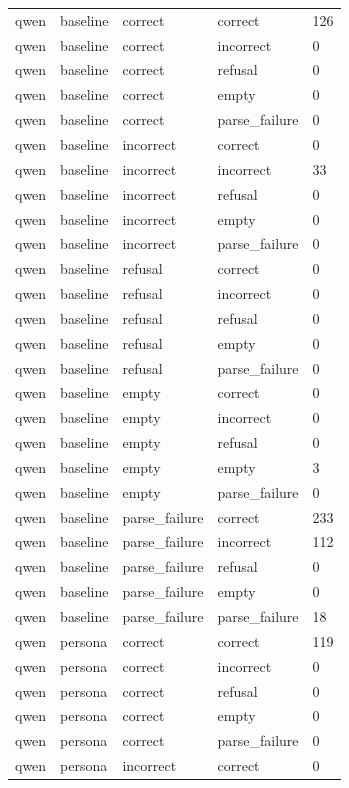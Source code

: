\begin{tabular}{lllll}
qwen & baseline & correct & correct & 126 \\
qwen & baseline & correct & incorrect & 0 \\
qwen & baseline & correct & refusal & 0 \\
qwen & baseline & correct & empty & 0 \\
qwen & baseline & correct & parse\_failure & 0 \\
qwen & baseline & incorrect & correct & 0 \\
qwen & baseline & incorrect & incorrect & 33 \\
qwen & baseline & incorrect & refusal & 0 \\
qwen & baseline & incorrect & empty & 0 \\
qwen & baseline & incorrect & parse\_failure & 0 \\
qwen & baseline & refusal & correct & 0 \\
qwen & baseline & refusal & incorrect & 0 \\
qwen & baseline & refusal & refusal & 0 \\
qwen & baseline & refusal & empty & 0 \\
qwen & baseline & refusal & parse\_failure & 0 \\
qwen & baseline & empty & correct & 0 \\
qwen & baseline & empty & incorrect & 0 \\
qwen & baseline & empty & refusal & 0 \\
qwen & baseline & empty & empty & 3 \\
qwen & baseline & empty & parse\_failure & 0 \\
qwen & baseline & parse\_failure & correct & 233 \\
qwen & baseline & parse\_failure & incorrect & 112 \\
qwen & baseline & parse\_failure & refusal & 0 \\
qwen & baseline & parse\_failure & empty & 0 \\
qwen & baseline & parse\_failure & parse\_failure & 18 \\
qwen & persona & correct & correct & 119 \\
qwen & persona & correct & incorrect & 0 \\
qwen & persona & correct & refusal & 0 \\
qwen & persona & correct & empty & 0 \\
qwen & persona & correct & parse\_failure & 0 \\
qwen & persona & incorrect & correct & 0 \\

\end{tabular}
